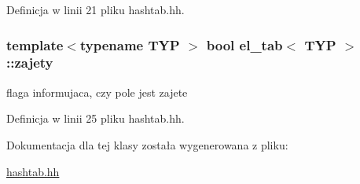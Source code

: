 \-Definicja w linii 21 pliku hashtab.\-hh.

\hypertarget{classel__tab_aa757d12b4a8d169c50bd8e6b8d0d1fd2}{
\subsubsection[{zajety}]{\setlength{\rightskip}{0pt plus 5cm}template$<$typename T\-Y\-P $>$ bool {\bf el\-\_\-tab}$<$ \-T\-Y\-P $>$\-::{\bf zajety}}}\label{classel__tab_aa757d12b4a8d169c50bd8e6b8d0d1fd2}


flaga informujaca, czy pole jest zajete 



\-Definicja w linii 25 pliku hashtab.\-hh.



\-Dokumentacja dla tej klasy została wygenerowana z pliku\-:\begin{DoxyCompactItemize}
\item 
\hyperlink{hashtab_8hh}{hashtab.\-hh}\end{DoxyCompactItemize}
